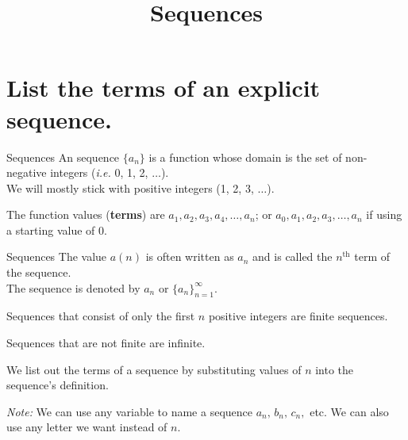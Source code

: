 \documentclass[t,usenames,dvipsnames]{beamer}
\title{Sequences}
\author{}
\date{}
\begin{document}
\begin{frame}
    \maketitle
\end{frame}

\section{List the terms of an explicit sequence.}

\begin{frame}{Sequences}
An \alert{sequence} $\{a_n\}$ is a function whose domain is the set of non-negative integers (\textit{i.e.} 0, 1, 2, $\dots$).  \newline\\

We will mostly stick with positive integers (1, 2, 3, $\dots$).   \newline\\  \pause

The function values (\textbf{terms}) are $a_1, a_2, a_3, a_4, \dots, a_n$; or $a_0, a_1, a_2, a_3, \dots, a_n$ if using a starting value of 0.
\end{frame}

\begin{frame}{Sequences}
The value $a(n)$ is often written as $a_n$ and is called the $n^\text{th}$ term of the sequence. \newline\\

The sequence is denoted by $a_n$ or $\{a_n\}^{\infty}_{n=1}$. \newline\\ \pause

Sequences that consist of only the first $n$ positive integers are \alert{finite sequences}.  \newline\\   \pause

Sequences that are not finite are infinite.   \newline\\    \pause

We list out the terms of a sequence by substituting values of $n$ into the sequence's definition. \newline\\ \pause

\emph{Note:} We can use any variable to name a sequence $a_n, \, b_n, \, c_n,$ etc.  We can also use any letter we want instead of $n$.
\end{frame}
\end{document}
